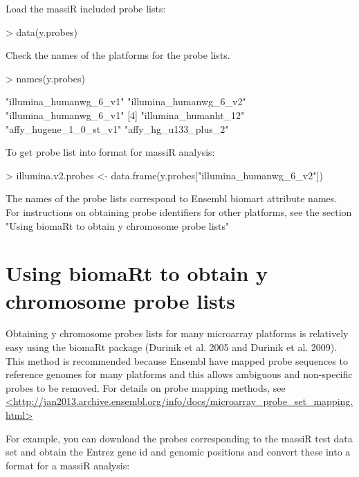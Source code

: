 \documentclass{article}
\begin{document}
Load the massiR included probe lists:
\begin{Schunk}
\begin{Sinput}
>  data(y.probes)
\end{Sinput}
\end{Schunk}
Check the names of the platforms for the probe lists.
\begin{Schunk}
\begin{Sinput}
>   names(y.probes)
\end{Sinput}
\begin{Soutput}
[1] "illumina_humanwg_6_v1" "illumina_humanwg_6_v2" "illumina_humanwg_6_v1"
[4] "illumina_humanht_12"   "affy_hugene_1_0_st_v1" "affy_hg_u133_plus_2"  
\end{Soutput}
\end{Schunk}
To get probe list into format for massiR analysis:
\begin{Schunk}
\begin{Sinput}
>   illumina.v2.probes <- data.frame(y.probes["illumina_humanwg_6_v2"])
\end{Sinput}
\end{Schunk}

The names of the probe lists correspond to Ensembl biomart attribute names.
For instructions on obtaining probe identifiers for other platforms, see the section "Using biomaRt to obtain y chromosome probe lists"

\section{Using biomaRt to obtain y chromosome probe lists}
Obtaining y chromosome probes lists for many microarray platforms is relatively easy using the biomaRt package (Durinik et al. 2005 and Durinik et al. 2009). This method is recommended because Ensembl have mapped probe sequences to reference genomes for many platforms and this allows ambiguous and non-specific probes to be removed. For details on probe mapping methods, see \url{<http://jan2013.archive.ensembl.org/info/docs/microarray_probe_set_mapping.html>}

For example, you can download the probes corresponding to the massiR test data set and obtain the Entrez gene id and genomic positions and convert these into a format for a massiR analysis:
\end{document}
